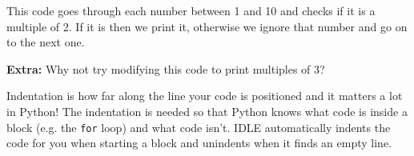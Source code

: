 		

		This code goes through each number between 1 and 10 and checks if it is a multiple of 2. If it is then we print it, otherwise we ignore that number and go on to the next one.

		\textbf{Extra:} Why not try modifying this code to print multiples of 3?

		\begin{aside}[Indentation]
			Indentation is how far along the line your code is positioned and it matters a lot in Python! The indentation is needed so that Python knows what code is inside a block (e.g. the \texttt{for} loop) and what code isn't. IDLE automatically indents the code for you when starting a block and unindents when it finds an empty line.
		\end{aside}

